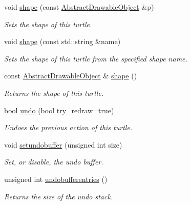 \begin{DoxyCompactItemize}
void \hyperlink{classcturtle_1_1Turtle_a5143887bbdb59bb55f583b62b2152a8e}{shape} (const \hyperlink{classcturtle_1_1AbstractDrawableObject}{Abstract\+Drawable\+Object} \&p)
\begin{DoxyCompactList}\small\item\em Sets the shape of this turtle. \end{DoxyCompactList}\item 
void \hyperlink{classcturtle_1_1Turtle_aecd7fb607369e3ece1854caa6ed92128}{shape} (const std\+::string \&name)
\begin{DoxyCompactList}\small\item\em Sets the shape of this turtle from the specified shape name. \end{DoxyCompactList}\item 
\mbox{\label{classcturtle_1_1Turtle_ab5b05852723852c00681da0844124e44}} 
const \hyperlink{classcturtle_1_1AbstractDrawableObject}{Abstract\+Drawable\+Object} \& \hyperlink{classcturtle_1_1Turtle_ab5b05852723852c00681da0844124e44}{shape} ()
\begin{DoxyCompactList}\small\item\em Returns the shape of this turtle. \end{DoxyCompactList}\item 
\mbox{\label{classcturtle_1_1Turtle_a123ef5c4bb86046e43a7bb138de81566}} 
bool \hyperlink{classcturtle_1_1Turtle_a123ef5c4bb86046e43a7bb138de81566}{undo} (bool try\+\_\+redraw=true)
\begin{DoxyCompactList}\small\item\em Undoes the previous action of this turtle. \end{DoxyCompactList}\item 
void \hyperlink{classcturtle_1_1Turtle_a91536102f8903dc237d97dbf3f326eba}{setundobuffer} (unsigned int size)
\begin{DoxyCompactList}\small\item\em Set, or disable, the undo buffer. \end{DoxyCompactList}\item 
\mbox{\label{classcturtle_1_1Turtle_ae7fd2fb0ac04dea930d6411f87229dfa}} 
unsigned int \hyperlink{classcturtle_1_1Turtle_ae7fd2fb0ac04dea930d6411f87229dfa}{undobufferentries} ()
\begin{DoxyCompactList}\small\item\em Returns the size of the undo stack. \end{DoxyCompactList}\item 

\end{DoxyCompactItemize}
